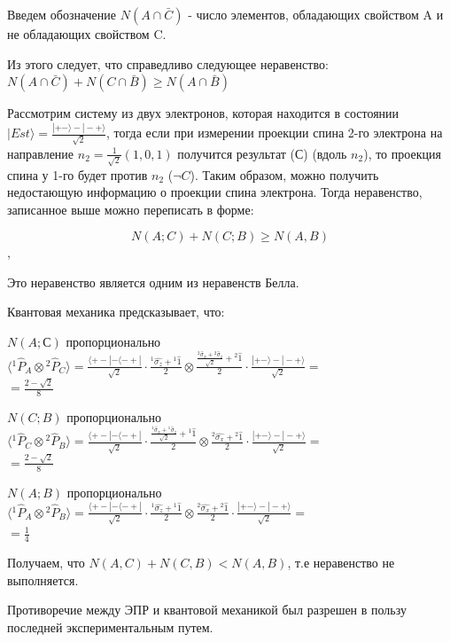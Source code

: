 \documentclass[__main__.tex]{subfiles}
\begin{document}
Введем обозначение $N(A \cap \bar{C})$ - число элементов, обладающих свойством A и не обладающих свойством C.

Из этого следует, что справедливо следующее неравенство: $N(A \cap \bar{C}) + N(C \cap \bar{B}) \ge N(A \cap \bar{B})$

Рассмотрим систему из двух электронов, которая находится в состоянии $|Est\rangle = \frac{|+-\rangle-|-+\rangle}{\sqrt{2}}$, тогда если при измерении проекции спина 2-го электрона на направление $n_2 = \frac{1}{\sqrt{2}}(1, 0, 1)$ получится результат (С) (вдоль $n_2$), то проекция спина у 1-го будет против $n_2$ ($\neg C$). Таким образом, можно получить недостающую информацию о проекции спина электрона. Тогда неравенство, записанное выше можно переписать в форме:

$$N(A; C) + N(C; B) \ge N(A, B)$$,

Это неравенство является одним из неравенств Белла.

Квантовая механика предсказывает, что:

$N(A; С)$ пропорционально $\langle {}^1 \hat{P}_A \otimes {}^2\hat{P}_C \rangle = \frac{\langle+-|-\langle-+|}{\sqrt{2}} \cdot \frac{{}^1\hat{\sigma_z} + {}^1 \hat{1}}{2} \otimes \frac{\frac{{}^2 \hat{\sigma}_x + {}^2 \hat{\sigma}_z}{\sqrt{2}} + {}^2 \hat{1}}{2} \cdot \frac{|+-\rangle - |-+\rangle}{\sqrt{2}} =$\\
$=\frac{2 - \sqrt{2}}{8}$

$N(C; B)$ пропорционально $\langle {}^1 \hat{P}_C \otimes {}^2\hat{P}_B \rangle = \frac{\langle+-|-\langle-+|}{\sqrt{2}} \cdot \frac{\frac{{}^1 \hat{\sigma}_x + {}^1 \hat{\sigma}_z}{\sqrt{2}} + {}^1 \hat{1}}{2} \otimes  \frac{{}^2\hat{\sigma_x} + {}^2 \hat{1}}{2} \cdot \frac{|+-\rangle - |-+\rangle}{\sqrt{2}} =$\\
$=\frac{2 - \sqrt{2}}{8}$

$N(A; B)$ пропорционально $\langle {}^1 \hat{P}_A \otimes {}^2\hat{P}_B \rangle =  \frac{\langle+-|-\langle-+|}{\sqrt{2}} \cdot  \frac{{}^1\hat{\sigma_z} + {}^1 \hat{1}}{2} \otimes  \frac{{}^2\hat{\sigma_x} + {}^2 \hat{1}}{2} \cdot  \frac{|+-\rangle - |-+\rangle}{\sqrt{2}} =$\\
$ = \frac{1}{4}$

Получаем, что $N(A, C) + N(C, B) < N(A, B)$, т.е неравенство не выполняется.

Противоречие между ЭПР и квантовой механикой был разрешен в пользу последней экспериментальным путем.
\end{document}

